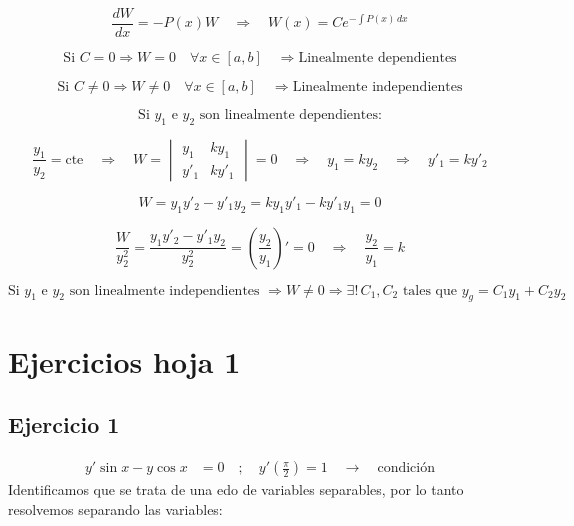 \documentclass[a4paper,12pt]{article}
\begin{document}
\newpage
\[
\frac{dW}{dx} = -P(x)W \quad \Longrightarrow \quad 
W(x) = C e^{-\int P(x)\,dx}
\]

\[
\text{Si } C = 0 \Longrightarrow W = 0 \quad \forall x \in [a,b] 
\quad \Rightarrow \text{Linealmente dependientes}
\]

\[
\text{Si } C \neq 0 \Longrightarrow W \neq 0 \quad \forall x \in [a,b] 
\quad \Rightarrow \text{Linealmente independientes}
\]

\[
\text{Si } y_1 \text{ e } y_2 \text{ son linealmente dependientes:}
\]

\[
\frac{y_1}{y_2} = \text{cte} \quad \Rightarrow \quad W = 
\begin{vmatrix}
y_1 & k y_1 \\
y'_1 & k y'_1
\end{vmatrix}
= 0 
\quad \Rightarrow \quad y_1 = k y_2 \quad \Rightarrow \quad y'_1 = k y'_2
\]

\[
W = y_1 y'_2 - y'_1 y_2 = k y_1 y'_1 - k y'_1 y_1 = 0
\]

\[
\frac{W}{y_2^2} = \frac{y_1 y'_2 - y'_1 y_2}{y_2^2} 
= \left(\frac{y_2}{y_1}\right)' = 0 
\quad \Longrightarrow \quad \frac{y_2}{y_1} = k
\]

\[
\text{Si } y_1 \text{ e } y_2 \text{ son linealmente independientes } 
\Longrightarrow W \neq 0 
\Longrightarrow \exists! \, C_1, C_2 \text{ tales que } 
y_g = C_1 y_1 + C_2 y_2
\]




























\newpage
\section{Ejercicios hoja 1}

\subsection{Ejercicio 1}
\vspace{-1.2em}
\[
\begin{aligned}
y' \sin x - y \cos x &= 0 
\quad ;\quad 
y'\!\left( \frac{\pi}{2} \right) = 1 \quad \rightarrow \quad \text{condición}
\end{aligned}
\]
Identificamos que se trata de una edo de variables separables, por lo tanto resolvemos 
separando las variables:
\end{document}
